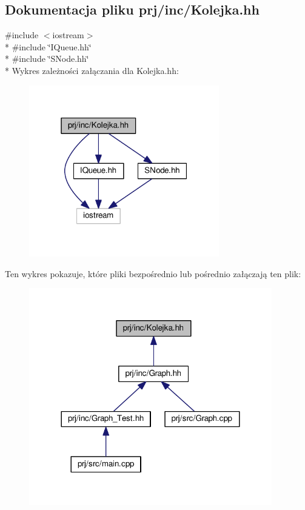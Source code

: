 \hypertarget{_kolejka_8hh}{\subsection{Dokumentacja pliku prj/inc/\-Kolejka.hh}
\label{_kolejka_8hh}
}
{\ttfamily \#include $<$iostream$>$}\\*
{\ttfamily \#include \char`\"{}I\-Queue.\-hh\char`\"{}}\\*
{\ttfamily \#include \char`\"{}S\-Node.\-hh\char`\"{}}\\*
Wykres zależności załączania dla Kolejka.\-hh\-:
\nopagebreak
\begin{figure}[H]
\begin{center}
\leavevmode
\includegraphics[width=235pt]{_kolejka_8hh__incl}
\end{center}
\end{figure}
Ten wykres pokazuje, które pliki bezpośrednio lub pośrednio załączają ten plik\-:
\nopagebreak
\begin{figure}[H]
\begin{center}
\leavevmode
\includegraphics[width=300pt]{_kolejka_8hh__dep__incl}
\end{center}
\end{figure}
